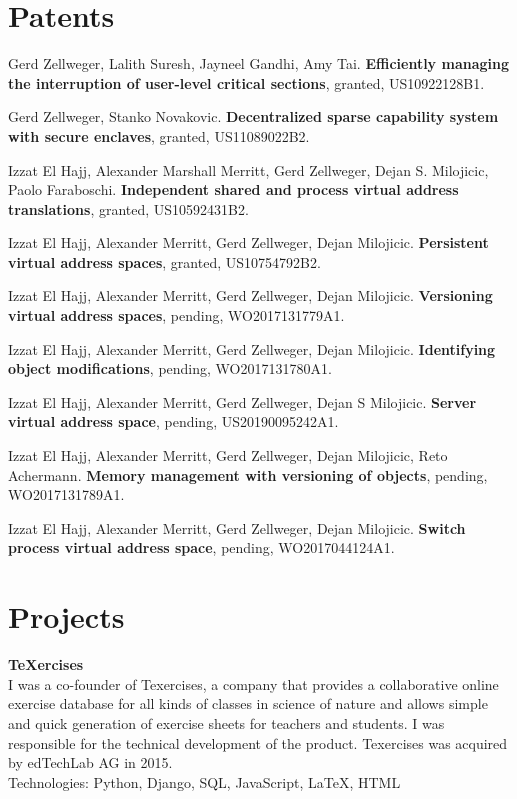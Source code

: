 \documentclass[margin,line]{cv/cv}
\begin{document}
\begin{resume}
    \section{\mysidestyle Patents}

    Gerd Zellweger, Lalith Suresh, Jayneel Gandhi, Amy Tai.
    \textbf{Efficiently managing the interruption of user-level critical sections},
    granted, US10922128B1.

    Gerd Zellweger, Stanko Novakovic.
    \textbf{Decentralized sparse capability system with secure enclaves},
    granted, US11089022B2.

    Izzat El Hajj, Alexander Marshall Merritt, Gerd Zellweger, Dejan S. Milojicic, Paolo Faraboschi.
    \textbf{Independent shared and process virtual address translations},
    granted, US10592431B2.

    Izzat El Hajj, Alexander Merritt, Gerd Zellweger, Dejan Milojicic.
    \textbf{Persistent virtual address spaces},
    granted, US10754792B2.

    Izzat El Hajj, Alexander Merritt, Gerd Zellweger, Dejan Milojicic.
    \textbf{Versioning virtual address spaces},
    pending, WO2017131779A1.

    Izzat El Hajj, Alexander Merritt, Gerd Zellweger, Dejan Milojicic.
    \textbf{Identifying object modifications},
    pending, WO2017131780A1.

    Izzat El Hajj, Alexander Merritt, Gerd Zellweger, Dejan S Milojicic.
    \textbf{Server virtual address space},
    pending, US20190095242A1.

    Izzat El Hajj, Alexander Merritt, Gerd Zellweger, Dejan Milojicic, Reto Achermann.
    \textbf{Memory management with versioning of objects},
    pending, WO2017131789A1.

    Izzat El Hajj, Alexander Merritt, Gerd Zellweger, Dejan Milojicic.
    \textbf{Switch process virtual address space},
    pending, WO2017044124A1.


    \section{\mysidestyle Projects}
    \textbf{{\TeX}ercises} \\\vspace{1mm}%
    I was a co-founder of Texercises, a company that provides a collaborative online
    exercise database for all kinds of classes in science of nature and allows
    simple and quick generation of exercise sheets for teachers and students. I was
    responsible for the technical development of the product. Texercises was
    acquired by edTechLab AG in 2015.\\
    Technologies: Python, Django, SQL, JavaScript, LaTeX, HTML


\end{resume}
\end{document}
